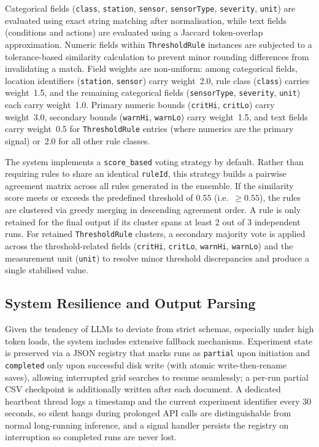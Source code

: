 \documentclass[11pt]{article}
\begin{document}
Categorical fields (\texttt{class}, \texttt{station}, \texttt{sensor},
\texttt{sensorType}, \texttt{severity}, \texttt{unit}) are evaluated using exact
string matching after normalisation, while text fields (conditions and actions) are
evaluated using a Jaccard token-overlap approximation. Numeric fields within
\texttt{ThresholdRule} instances are subjected to a tolerance-based similarity
calculation to prevent minor rounding differences from invalidating a match. Field weights are non-uniform: among categorical fields, location identifiers
(\texttt{station}, \texttt{sensor}) carry weight~2.0, rule class
(\texttt{class}) carries weight~1.5, and the remaining categorical fields
(\texttt{sensorType}, \texttt{severity}, \texttt{unit}) each carry weight~1.0.
Primary numeric bounds (\texttt{critHi}, \texttt{critLo}) carry weight~3.0,
secondary bounds (\texttt{warnHi}, \texttt{warnLo}) carry weight~1.5, and text
fields carry weight~0.5 for \texttt{ThresholdRule} entries (where numerics are
the primary signal) or~2.0 for all other rule classes.

The system implements a \texttt{score\_based} voting strategy by default. Rather
than requiring rules to share an identical \texttt{ruleId}, this strategy builds a
pairwise agreement matrix across all rules generated in the ensemble. If the
similarity score meets or exceeds the predefined threshold of $0.55$
(i.e.\ $\geq 0.55$), the rules are clustered via greedy merging in descending
agreement order. A rule is only retained
for the final output if its cluster spans at least 2 out of 3 independent runs.
For retained \texttt{ThresholdRule} clusters, a secondary majority vote is applied
across the threshold-related fields (\texttt{critHi}, \texttt{critLo},
\texttt{warnHi}, \texttt{warnLo}) and the measurement unit (\texttt{unit}) to
resolve minor threshold discrepancies and produce a single stabilised value.

\subsection{System Resilience and Output Parsing}
Given the tendency of LLMs to deviate from strict schemas, especially under high
token loads, the system includes extensive fallback mechanisms. Experiment state is
preserved via a JSON registry that marks runs as \texttt{partial} upon initiation
and \texttt{completed} only upon successful disk write (with atomic
write-then-rename saves), allowing interrupted grid searches to resume
seamlessly; a per-run partial CSV checkpoint is additionally written after each
document. A dedicated heartbeat thread logs a timestamp and the current
experiment identifier every 30 seconds, so silent hangs during prolonged API
calls are distinguishable from normal long-running inference, and a signal
handler persists the registry on interruption so completed runs are never lost.
\end{document}
